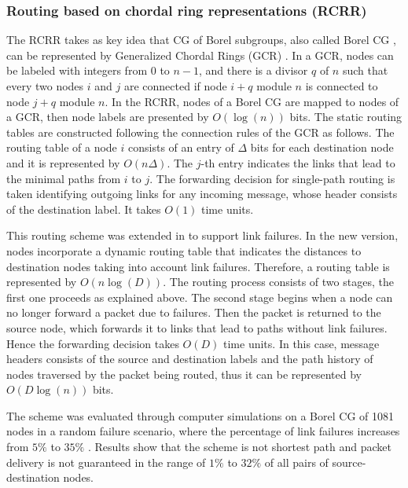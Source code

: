 \subsubsection{Routing based on chordal ring representations (RCRR)}
The RCRR takes as key idea that CG of Borel subgroups, also called Borel CG \cite{borel_cg,tang_topos,wsn_borel,exp_borel}, can be represented by Generalized Chordal Rings (GCR) \cite{Tang92}.
In a GCR, nodes can be labeled with integers from $0$ to $n-1$, and there is a divisor $q$ of $n$ such that every two nodes $i$ and $j$ are connected if node $i + q$ module $n$ is connected to node $j + q$ module $n$.
In the RCRR, nodes of a Borel CG are mapped to nodes of a GCR, then node labels are presented by $O(\log(n))$ bits. The static routing tables are constructed following the connection rules of the GCR as follows. The routing table of a node $i$ consists of an entry of $\Delta$ bits for each destination node and it is represented by $O(n\Delta)$. The $j$-th entry indicates the links that lead to the minimal paths from $i$ to $j$. The forwarding decision for single-path routing is taken identifying outgoing links for any incoming message, whose header consists of the destination label. It takes $O(1)$ time units.

This routing scheme was extended in \cite{Tang_ft} to support link failures. In the new version, nodes incorporate a dynamic routing table that indicates the distances to destination nodes taking into account link failures. Therefore, a routing table is represented by $O(n\log(D))$. The routing process consists of two stages, the first one proceeds as explained above. The second stage begins when a node can no longer forward a packet due to failures. Then the packet is returned to the source node, which forwards it to links that lead to paths without link failures. Hence the forwarding decision takes $O(D)$ time units. In this case, message headers consists of the source and destination labels and the path history of nodes traversed by the packet being routed, thus it can be represented by $O(D\log(n))$ bits. 

The scheme was evaluated through computer simulations on a Borel CG of 1081 nodes in a random failure scenario, where the percentage of link failures increases from $5\%$ to $35\%$  \cite{Tang_ft}. Results show that the scheme is not shortest path and packet delivery is not guaranteed in the range of $1\%$ to $32\%$ of all pairs of source-destination nodes.


